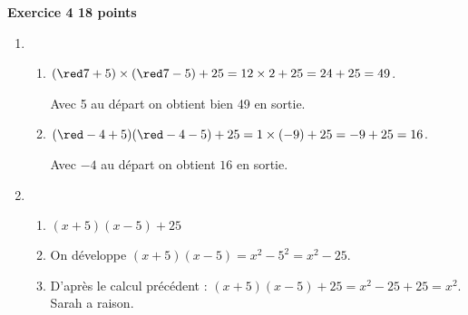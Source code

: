 \textbf{\large Exercice 4 \hfill 18 points}

\medskip

\begin{enumerate}
\item 
	\begin{enumerate}
		\item $({\red 7} + 5) \times ({\red 7} - 5) + 25 = 12 \times 2 + 25 = 24 + 25  = 49$.

Avec 5 au départ on obtient bien 49 en sortie.
		\item $({\red - 4} + 5)({\red - 4} - 5) + 25 = 1 \times (- 9) +25 = - 9 + 25
= 16$.

Avec $- 4$ au départ on obtient $16$ en sortie.
	\end{enumerate}
\item
	\begin{enumerate}
		\item $(x + 5)(x - 5) + 25$ 
		\item On développe $(x + 5)(x - 5) = x^2 - 5^2
= x^2 - 25$.
		\item D'après le calcul précédent : $(x + 5)(x - 5) + 25 = x^2 - 25 + 25 = x^2$.
Sarah a raison.
	\end{enumerate}
\end{enumerate}

\bigskip

